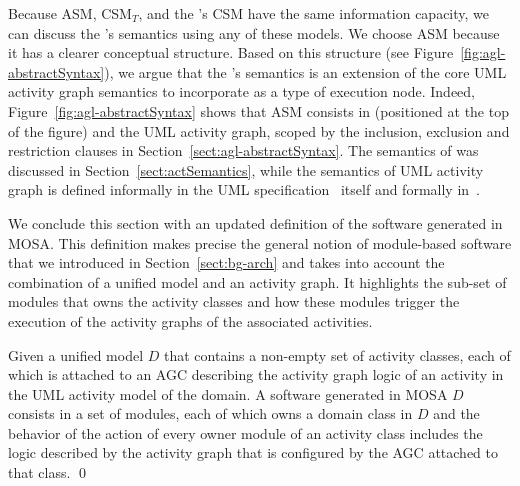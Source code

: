 Because ASM, CSM$_T$, and the \agl's CSM have the same information capacity, we can discuss the \agl's semantics using any of these models. We choose ASM because it has a clearer conceptual structure. Based on this structure (see Figure~\ref{fig:agl-abstractSyntax}), we argue that the \agl's semantics is an extension of the core UML activity graph semantics to incorporate  as a type of execution node. Indeed, Figure~\ref{fig:agl-abstractSyntax} shows that ASM consists in  (positioned at the top of the figure) and the UML activity graph, scoped by the inclusion, exclusion and restriction clauses in Section~\ref{sect:agl-abstractSyntax}. The semantics of  was discussed in Section~\ref{sect:actSemantics}, while the semantics of UML activity graph is defined informally in the UML specification~\cite{omg_unified_2015} itself and formally in~\cite{daw_extensible_2015}.

We conclude this section with an updated definition of the software generated in MOSA. This definition makes precise the general notion of module-based software that we introduced in Section~\ref{sect:bg-arch} and takes into account the combination of a unified model and an activity graph. It highlights the sub-set of modules that owns the activity classes and how these modules trigger the execution of the activity graphs of the associated activities.
%
\begin{definition} \label{def:software}
Given a unified model $D$ that contains a non-empty set of activity classes, each of which is attached to an AGC describing the activity graph logic of an activity in the UML activity model of the domain. A software generated in MOSA \wrt $D$ consists in a set of modules, each of which owns a domain class in $D$ and the behavior of the  action of every owner module of an activity class includes the logic described by the activity graph that is configured by the AGC attached to that class. \qed
\end{definition}




